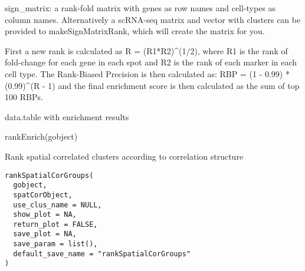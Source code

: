 \documentclass[a4paper]{book}
\begin{document}
%
\begin{Details}\relax
sign\_matrix: a rank-fold matrix with genes as row names and cell-types as column names.
Alternatively a scRNA-seq matrix and vector with clusters can be provided to makeSignMatrixRank, which will create
the matrix for you. \\{}

First a new rank is calculated as R = (R1*R2)\textasciicircum{}(1/2), where R1 is the rank of
fold-change for each gene in each spot and R2 is the rank of each marker in each cell type.
The Rank-Biased Precision is then calculated as: RBP = (1 - 0.99) * (0.99)\textasciicircum{}(R - 1)
and the final enrichment score is then calculated as the sum of top 100 RBPs.
\end{Details}
%
\begin{Value}
data.table with enrichment results
\end{Value}
%
\begin{SeeAlso}\relax
{}
\end{SeeAlso}
%
\begin{Examples}
\begin{ExampleCode}
    rankEnrich(gobject)
\end{ExampleCode}
\end{Examples}
%
\begin{Description}\relax
Rank spatial correlated clusters according to correlation structure
\end{Description}
%
\begin{Usage}
\begin{verbatim}
rankSpatialCorGroups(
  gobject,
  spatCorObject,
  use_clus_name = NULL,
  show_plot = NA,
  return_plot = FALSE,
  save_plot = NA,
  save_param = list(),
  default_save_name = "rankSpatialCorGroups"
)
\end{verbatim}
\end{Usage}
%
\end{document}
